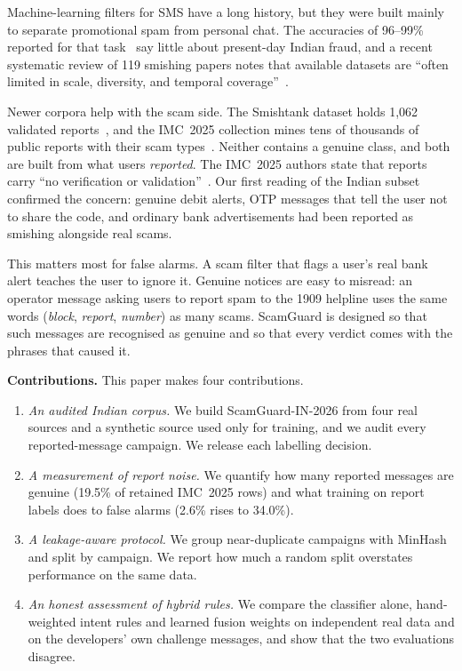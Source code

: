 \documentclass[conference]{IEEEtran}
\begin{document}
Machine-learning filters for SMS have a long history, but they were built mainly to separate promotional spam from personal chat. The accuracies of 96--99\% reported for that task~\cite{roy2020deep,goel2024ml,ahmadi2025llm} say little about present-day Indian fraud, and a recent systematic review of 119 smishing papers notes that available datasets are ``often limited in scale, diversity, and temporal coverage''~\cite{pritom2026sms}.

Newer corpora help with the scam side. The Smishtank dataset holds 1,062 validated reports~\cite{timko2024smishing}, and the IMC~2025 collection mines tens of thousands of public reports with their scam types~\cite{agarwal2025fishing}. Neither contains a genuine class, and both are built from what users \emph{reported}. The IMC~2025 authors state that reports carry ``no verification or validation''~\cite{agarwal2025fishing}. Our first reading of the Indian subset confirmed the concern: genuine debit alerts, OTP messages that tell the user not to share the code, and ordinary bank advertisements had been reported as smishing alongside real scams.

This matters most for false alarms. A scam filter that flags a user's real bank alert teaches the user to ignore it. Genuine notices are easy to misread: an operator message asking users to report spam to the 1909 helpline uses the same words (\textit{block}, \textit{report}, \textit{number}) as many scams. ScamGuard is designed so that such messages are recognised as genuine and so that every verdict comes with the phrases that caused it.

\textbf{Contributions.} This paper makes four contributions.
\begin{enumerate}
\item \textit{An audited Indian corpus.} We build ScamGuard-IN-2026 from four real sources and a synthetic source used only for training, and we audit every reported-message campaign. We release each labelling decision.
\item \textit{A measurement of report noise.} We quantify how many reported messages are genuine (19.5\% of retained IMC~2025 rows) and what training on report labels does to false alarms (2.6\% rises to 34.0\%).
\item \textit{A leakage-aware protocol.} We group near-duplicate campaigns with MinHash and split by campaign. We report how much a random split overstates performance on the same data.
\item \textit{An honest assessment of hybrid rules.} We compare the classifier alone, hand-weighted intent rules and learned fusion weights on independent real data and on the developers' own challenge messages, and show that the two evaluations disagree.
\end{enumerate}
\end{document}
